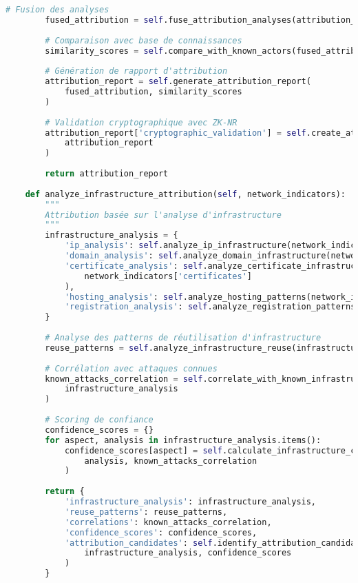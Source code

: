 \begin{lstlisting}[language=Python, caption=Système d'attribution multi-dimensionnel]
        # Fusion des analyses
        fused_attribution = self.fuse_attribution_analyses(attribution_results)
        
        # Comparaison avec base de connaissances
        similarity_scores = self.compare_with_known_actors(fused_attribution)
        
        # Génération de rapport d'attribution
        attribution_report = self.generate_attribution_report(
            fused_attribution, similarity_scores
        )
        
        # Validation cryptographique avec ZK-NR
        attribution_report['cryptographic_validation'] = self.create_attribution_proof(
            attribution_report
        )
        
        return attribution_report
    
    def analyze_infrastructure_attribution(self, network_indicators):
        """
        Attribution basée sur l'analyse d'infrastructure
        """
        infrastructure_analysis = {
            'ip_analysis': self.analyze_ip_infrastructure(network_indicators['ips']),
            'domain_analysis': self.analyze_domain_infrastructure(network_indicators['domains']),
            'certificate_analysis': self.analyze_certificate_infrastructure(
                network_indicators['certificates']
            ),
            'hosting_analysis': self.analyze_hosting_patterns(network_indicators),
            'registration_analysis': self.analyze_registration_patterns(network_indicators)
        }
        
        # Analyse des patterns de réutilisation d'infrastructure
        reuse_patterns = self.analyze_infrastructure_reuse(infrastructure_analysis)
        
        # Corrélation avec attaques connues
        known_attacks_correlation = self.correlate_with_known_infrastructure(
            infrastructure_analysis
        )
        
        # Scoring de confiance
        confidence_scores = {}
        for aspect, analysis in infrastructure_analysis.items():
            confidence_scores[aspect] = self.calculate_infrastructure_confidence(
                analysis, known_attacks_correlation
            )
            
        return {
            'infrastructure_analysis': infrastructure_analysis,
            'reuse_patterns': reuse_patterns,
            'correlations': known_attacks_correlation,
            'confidence_scores': confidence_scores,
            'attribution_candidates': self.identify_attribution_candidates(
                infrastructure_analysis, confidence_scores
            )
        }
\end{lstlisting}

